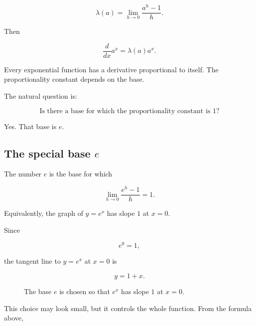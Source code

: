 \[
\lambda(a)=\lim_{h\to0}\frac{a^h-1}{h}.
\]

Then

\[
\boxed{
\frac{d}{dx}a^x=\lambda(a)a^x.
}
\]

Every exponential function has a derivative proportional to itself.  The proportionality constant depends on the base.

The natural question is:

\[
\text{Is there a base for which the proportionality constant is }1?
\]

Yes.  That base is \(e\).

\subsection{The special base \texorpdfstring{\(e\)}{e}}
\label{subsec:special-base-e}

The number \(e\) is the base for which

\[
\lim_{h\to0}\frac{e^h-1}{h}=1.
\]

Equivalently, the graph of \(y=e^x\) has slope \(1\) at \(x=0\).

Since

\[
e^0=1,
\]

the tangent line to \(y=e^x\) at \(x=0\) is

\[
y=1+x.
\]

\begin{figure}[h]
\centering
{}
\caption{The base \(e\) is chosen so that \(e^x\) has slope \(1\) at \(x=0\).}
\label{fig:exponential-tangent-at-zero}
\end{figure}

This choice may look small, but it controls the whole function.  From the formula above,

